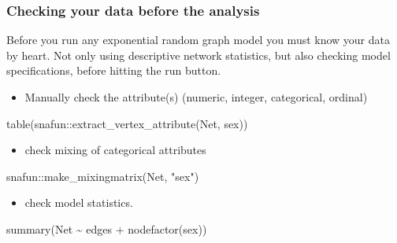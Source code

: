 \documentclass[
]{article}
\newenvironment{Shaded}{\begin{snugshade}}{\end{snugshade}}
\newcommand{\FunctionTok}[1]{\textcolor[rgb]{0.00,0.00,0.00}{#1}}
\newcommand{\NormalTok}[1]{#1}
\newcommand{\SpecialCharTok}[1]{\textcolor[rgb]{0.00,0.00,0.00}{#1}}
\newcommand{\StringTok}[1]{\textcolor[rgb]{0.31,0.60,0.02}{#1}}
\providecommand{\tightlist}{%
  \setlength{\itemsep}{0pt}\setlength{\parskip}{0pt}}
\begin{document}
\hypertarget{checking-your-data-before-the-analysis}{%
\subsubsection{Checking your data before the
analysis}\label{checking-your-data-before-the-analysis}}

Before you run any exponential random graph model you must know your
data by heart. Not only using descriptive network statistics, but also
checking model specifications, before hitting the run button.

\begin{itemize}
\tightlist
\item
  Manually check the attribute(s) (numeric, integer, categorical,
  ordinal)
\end{itemize}

\begin{Shaded}
\begin{Highlighting}[]
\FunctionTok{table}\NormalTok{(snafun}\SpecialCharTok{::}\FunctionTok{extract\_vertex\_attribute}\NormalTok{(Net, }\StringTok{\textquotesingle{}sex\textquotesingle{}}\NormalTok{))}
\end{Highlighting}
\end{Shaded}

\begin{itemize}
\tightlist
\item
  check mixing of categorical attributes
\end{itemize}

\begin{Shaded}
\begin{Highlighting}[]
\NormalTok{snafun}\SpecialCharTok{::}\FunctionTok{make\_mixingmatrix}\NormalTok{(Net, }\StringTok{"sex"}\NormalTok{)}
\end{Highlighting}
\end{Shaded}

\begin{itemize}
\tightlist
\item
  check model statistics.
\end{itemize}

\begin{Shaded}
\begin{Highlighting}[]
\FunctionTok{summary}\NormalTok{(Net }\SpecialCharTok{\textasciitilde{}}\NormalTok{ edges }\SpecialCharTok{+} \FunctionTok{nodefactor}\NormalTok{(}\StringTok{\textquotesingle{}sex\textquotesingle{}}\NormalTok{))}
\end{Highlighting}
\end{Shaded}
\end{document}

